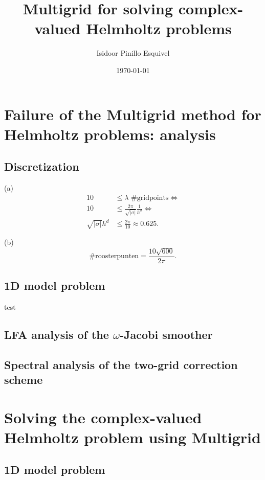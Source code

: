 \documentclass[a4paper,12pt]{article}
\begin{document}
\title{Multigrid for solving complex-valued Helmholtz problems}
\author{Isidoor Pinillo Esquivel}
\date{\today}
\maketitle

\section{Failure of the Multigrid method for Helmholtz problems: analysis}

\subsection{Discretization}
(a)
\begin{align*}
    10                    & \leq \lambda \text{ \#gridpoints} \Leftrightarrow                \\
    10                    & \leq \frac{2\pi}{\sqrt{|\sigma|}} \frac{1}{h^{d}}\Leftrightarrow \\
    \sqrt{|\sigma|} h^{d} & \leq \frac{2 \pi}{10} \approx 0.625.
\end{align*}

(b)
\[
    \text{\# roosterpunten} = \frac{10 \sqrt{600}}{2 \pi}
    .\]

\subsection{1D model problem}

test

\subsection{LFA analysis of the $\omega$-Jacobi smoother}

\subsection{Spectral analysis of the two-grid correction scheme}

\section{Solving the complex-valued Helmholtz problem using Multigrid}

\subsection{1D model problem}
\end{document}
